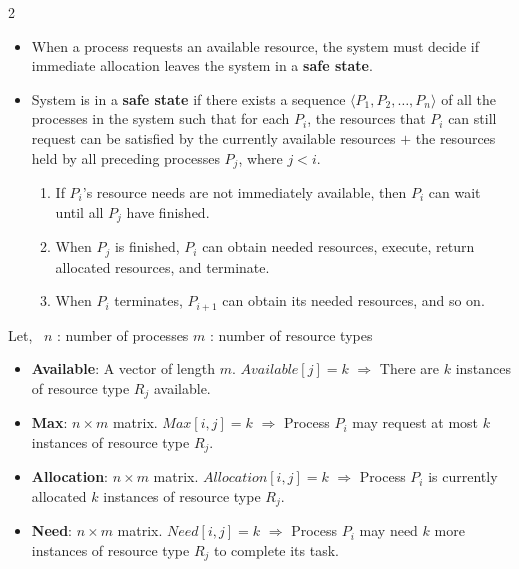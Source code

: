 \begin{multicols}{2}
\begin{itemize}
    \item When a process requests an available resource, the system must decide if immediate allocation leaves the system in a \textbf{safe state}.

    \item System is in a \textbf{safe state} if there exists a sequence $\langle P_1, P_2, \dots, P_n \rangle$ of all the processes in the system such that for each $P_i$, the resources that $P_i$ can still request can be satisfied by the currently available resources $+$ the resources held by all preceding processes $P_j$, where $j < i$.
    
    \begin{enumerate}
        \item If $P_i$'s resource needs are not immediately available, then $P_i$ can wait until all $P_j$ have finished.
        \item When $P_j$ is finished, $P_i$ can obtain needed resources, execute, return allocated resources, and terminate.
        \item When $P_i$ terminates, $P_{i+1}$ can obtain its needed resources, and so on.
    \end{enumerate}
\end{itemize}



Let, \ $n$ : number of processes \quad $m$ : number of resource types
\begin{itemize}[leftmargin=*]
    \item \textbf{Available}: A vector of length $m$. $Available[j]=k$ $\Rightarrow$ There are $k$ instances of resource type $R_j$ available.

    \item \textbf{Max}: $n \times m$ matrix. $Max[i,j]=k$ $\Rightarrow$ Process $P_i$ may request at most $k$ instances of resource type $R_j$.
    
    \item \textbf{Allocation}: $n \times m$ matrix. $Allocation[i,j]=k$ $\Rightarrow$ Process $P_i$ is currently allocated $k$ instances of resource type $R_j$.
    
    \item \textbf{Need}: $n \times m$ matrix. $Need[i,j]=k$ $\Rightarrow$ Process $P_i$ may need $k$ more instances of resource type $R_j$ to complete its task.
\end{itemize}


\end{multicols}
